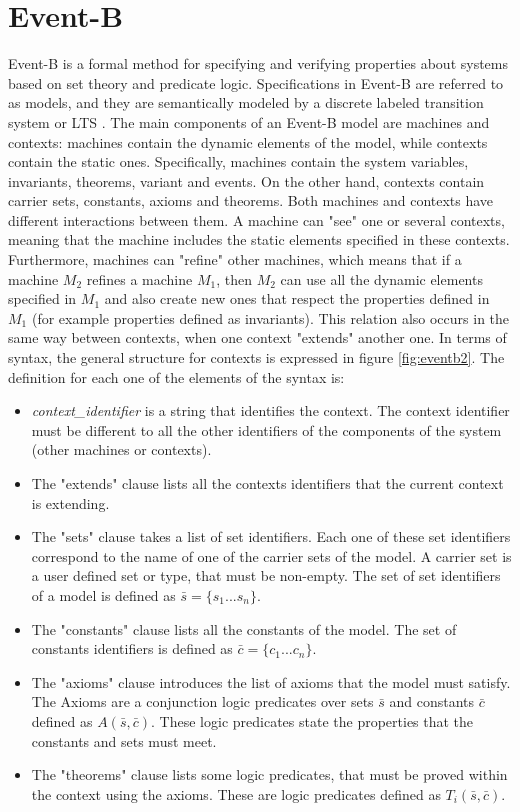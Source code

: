 \section{Event-B}
Event-B \cite{Abrial2011,Butler2013} is a formal method for specifying and verifying properties about systems based on set theory and predicate logic. Specifications in Event-B are referred to as models, and they are semantically modeled by a discrete labeled transition system or LTS \cite{LTS}. The main components of an Event-B model are machines and contexts: machines contain the dynamic elements of the model, while contexts contain the static ones. Specifically, machines contain the system variables, invariants, theorems, variant and events. On the other hand, contexts contain carrier sets, constants, axioms and theorems. Both machines and contexts have different interactions between them. A machine can "see" one or several contexts, meaning that the machine includes the static elements specified in these contexts. Furthermore, machines can "refine" other machines, which means that if a machine $M_2$ refines a machine $M_1$, then $M_2$ can use all the dynamic elements specified in $M_1$ and also create new ones that respect the properties defined in $M_1$ (for example properties defined as invariants). This relation also occurs in the same way between contexts, when one context "extends" another one.
In terms of syntax, the general structure for contexts is expressed in figure \ref{fig:eventb2}. The definition for each one of the elements of the syntax is:
\begin{itemize}
    \item \textit{context\_identifier} is a string that identifies the context. The context identifier must be different to all the other identifiers of the components of the system (other machines or contexts).
    \item The "extends" clause lists all the contexts identifiers that the current context is extending.
    \item The "sets" clause takes a list of set identifiers. Each one of these set identifiers correspond to the name of one of the carrier sets of the model. A carrier set is a user defined set or type, that must be non-empty. The set of set identifiers of a model is defined as $\bar{s} = \{s_1...s_n\}$. 
    \item The "constants" clause lists all the constants of the model. The set of constants identifiers is defined as $\bar{c} = \{c_1...c_n\}$.
    \item The "axioms" clause introduces the list of axioms that the model must satisfy. The Axioms are a conjunction logic predicates over sets $\bar{s}$ and constants $\bar{c}$ defined as $A(\bar{s},\bar{c})$. These logic predicates state the properties that the constants and sets must meet.
    \item The "theorems" clause lists some logic predicates, that must be proved within the context using the axioms. These are logic predicates defined as $T_i(\bar{s},\bar{c})$.
\end{itemize}
